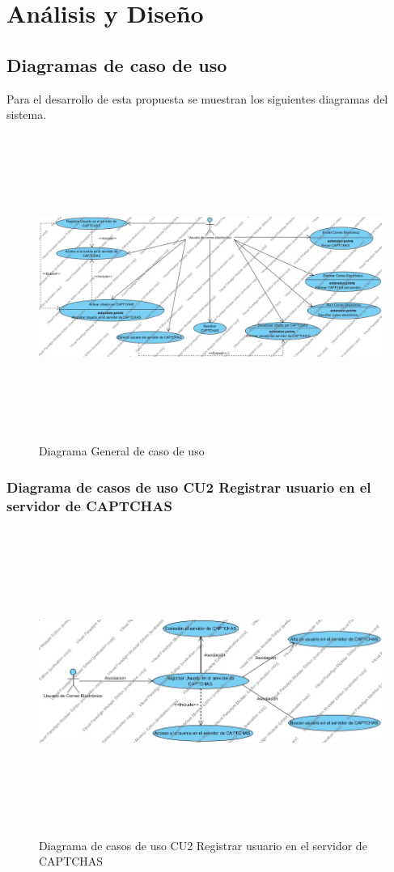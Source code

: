 \documentclass[12pt,oneside,onecolumn,openany]{report}
\begin{document}
\chapter{An\'alisis y Dise\~no} %
\section{Diagramas de caso de uso}
Para el desarrollo de esta propuesta se muestran los siguientes diagramas del sistema.
\begin{figure}[H]
	\includegraphics[width=1\linewidth, height=10cm]{./images/casodeuso1.jpg}
	\caption{Diagrama General de caso de uso}
	\label{fig:4-2-1}
\end{figure}
\subsection{Diagrama de casos de uso CU2 Registrar usuario en el servidor de CAPTCHAS}
\begin{figure}[H]
	\includegraphics[width=1\linewidth, height=10cm]{./images/casodeuso2.jpg}
	\caption{Diagrama de casos de uso CU2 Registrar usuario en el servidor de CAPTCHAS}
	\label{fig:4-3-1}
\end{figure}
\end{document}
